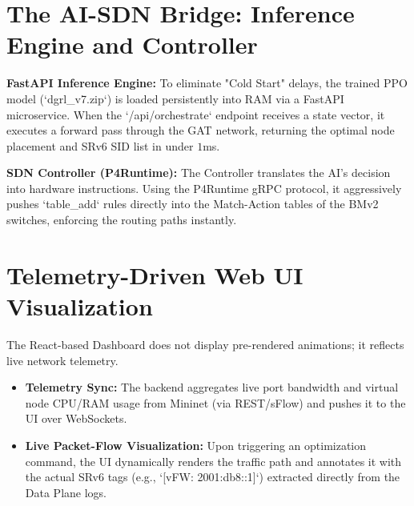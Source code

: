 \section{The AI-SDN Bridge: Inference Engine and Controller}
\textbf{FastAPI Inference Engine:} To eliminate "Cold Start" delays, the trained PPO model (`dgrl_v7.zip`) is loaded persistently into RAM via a FastAPI microservice. When the `/api/orchestrate` endpoint receives a state vector, it executes a forward pass through the GAT network, returning the optimal node placement and SRv6 SID list in under $1$ms.

\textbf{SDN Controller (P4Runtime):} The Controller translates the AI's decision into hardware instructions. Using the P4Runtime gRPC protocol, it aggressively pushes `table_add` rules directly into the Match-Action tables of the BMv2 switches, enforcing the routing paths instantly.

\section{Telemetry-Driven Web UI Visualization}
The React-based Dashboard does not display pre-rendered animations; it reflects live network telemetry.
\begin{itemize}
    \item \textbf{Telemetry Sync:} The backend aggregates live port bandwidth and virtual node CPU/RAM usage from Mininet (via REST/sFlow) and pushes it to the UI over WebSockets.
    \item \textbf{Live Packet-Flow Visualization:} Upon triggering an optimization command, the UI dynamically renders the traffic path and annotates it with the actual SRv6 tags (e.g., `[vFW: 2001:db8::1]`) extracted directly from the Data Plane logs.
\end{itemize}


